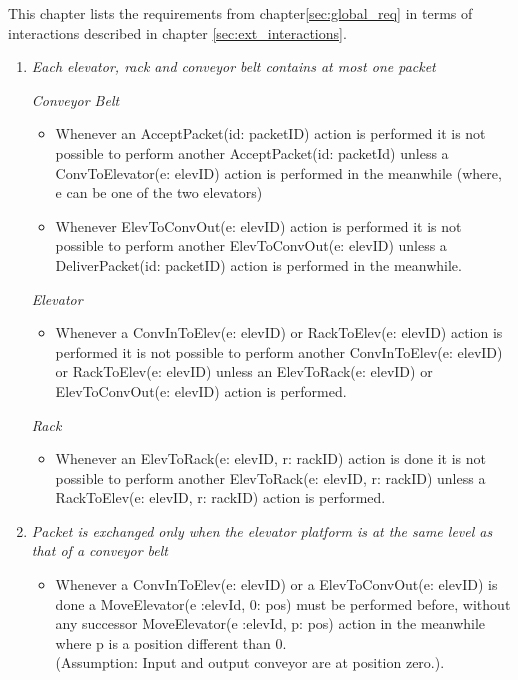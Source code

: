 
This chapter lists the requirements from chapter\ref{sec:global_req} in terms of interactions described in chapter \ref{sec:ext_interactions}.

\begin{enumerate}
\item \textit{Each elevator, rack and conveyor belt contains at most one packet}

	\textit{Conveyor Belt}
	\begin{itemize}
	\item
	Whenever an AcceptPacket(id: packetID) action is performed it
	is not possible to perform another AcceptPacket(id:
	packetId) unless a ConvToElevator(e: elevID) action is
	performed in the meanwhile (where, e can be one of the two elevators)
	\item Whenever ElevToConvOut(e: elevID) action is performed it is
	not possible to perform another ElevToConvOut(e: 
	elevID) unless a DeliverPacket(id: packetID) action is performed in the meanwhile.
	\end{itemize}
	\textit{Elevator}
	\begin{itemize}
	\item Whenever a ConvInToElev(e: elevID) or RackToElev(e: elevID) 
	action is performed it is not possible to perform another
	ConvInToElev(e: elevID) or RackToElev(e: elevID) unless an 
	ElevToRack(e: elevID) or ElevToConvOut(e: elevID) action is performed.
	\end{itemize}
	
	\textit{Rack}
	\begin{itemize}
	\item Whenever an ElevToRack(e: elevID, r: rackID) action is done it is not
	possible to perform another ElevToRack(e: elevID, r: rackID) unless a RackToElev(e: elevID, r: rackID) action is performed.%
	\end{itemize}

\item \textit{ Packet is exchanged only when the elevator platform is at
the same level as that of a conveyor belt}
	\begin{itemize}
	\item Whenever a ConvInToElev(e: elevID) or a ElevToConvOut(e: 
	elevID) is done a MoveElevator(e :elevId, 0: pos) must be
	performed before, without any successor MoveElevator(e :elevId, p: pos) action in the meanwhile where p is a position different than 0.\\(Assumption: Input and output conveyor are at
	position zero.).	
	\end{itemize}


\end{enumerate}

